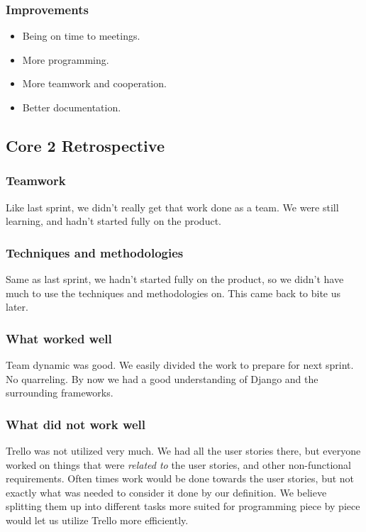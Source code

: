 \subsubsection{Improvements}
\begin{itemize}
    \item Being on time to meetings.
    \item More programming.
    \item More teamwork and cooperation.
    \item Better documentation.
\end{itemize}

\subsection{Core 2 Retrospective}
\subsubsection{Teamwork}
Like last sprint, we didn't really get that work done as a team. We were still learning, and hadn't started fully on the product.

\subsubsection{Techniques and methodologies}
Same as last sprint, we hadn't started fully on the product, so we didn't have much to use the techniques and methodologies on. This came back to bite us later.

\subsubsection{What worked well}
Team dynamic was good. We easily divided the work to prepare for next sprint. No quarreling. By now we had a good understanding of Django and the surrounding frameworks. 

\subsubsection{What did not work well}
Trello was not utilized very much. We had all the user stories there, but everyone worked on things that were \textit{related to} the user stories, and other non-functional requirements. Often times work would be done towards the user stories, but not exactly what was needed to consider it done by our definition. We believe splitting them up into different tasks more suited for programming piece by piece would let us utilize Trello more efficiently.

